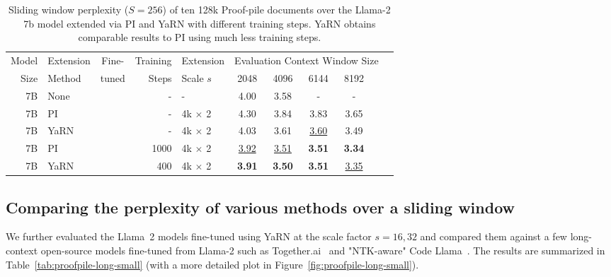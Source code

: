 \documentclass{article} %
\newcommand{\cmark}{\textcolor{green!80!black}{\ding{51}}}
\newcommand{\xmark}{\textcolor{red}{\ding{55}}}
\begin{document}
\begin{table}[h]
    \centering
    \begin{tabular}{rlcrlcccccc}
        \toprule
         Model & Extension & Fine-  & Training & Extension & \multicolumn{5}{c}{Evaluation Context Window Size}  \\
         Size  & Method    & tuned &  Steps    & Scale $s$ & 2048 & 4096 & 6144 & 8192\\
        \midrule
        7B & None & \xmark & -    & - & 4.00 & 3.58 & - & - \\
        \midrule
        7B & PI   & \xmark & -    & 4k $\times$ 2 & 4.30 & 3.84 & 3.83 & 3.65 \\
        7B & YaRN & \xmark & -    & 4k $\times$ 2 & 4.03 & 3.61 & \underline{3.60} & 3.49 \\
        \midrule
        7B & PI   & \cmark & 1000 & 4k $\times$ 2 & \underline{3.92} & \underline{3.51} & \textbf{3.51} & \textbf{3.34} \\
        7B & YaRN & \cmark & 400  & 4k $\times$ 2 & \textbf{3.91} & \textbf{3.50} & \textbf{3.51} & \underline{3.35} \\
        \bottomrule
    \end{tabular}
    \caption{\small Sliding window perplexity ($S=256$) of ten 128k Proof-pile documents over the Llama-2 7b model extended via PI and YaRN with different training steps. YaRN obtains comparable results to PI using much less training steps.}
    \label{tab:8k-comparison}
\end{table}


\subsection{Comparing the perplexity of various methods over a sliding window}\label{appendix:long-sequence}

We further evaluated the Llama~2 models fine-tuned using YaRN at the scale factor $s=16, 32$ and compared them against a few long-context open-source models fine-tuned from Llama-2 such as Together.ai~\citep{together} and "NTK-aware" Code Llama~\citep{rozière2023code}.
The results are summarized in Table~\ref{tab:proofpile-long-small} (with a more detailed plot in Figure~\ref{fig:proofpile-long-small}).
\end{document}
